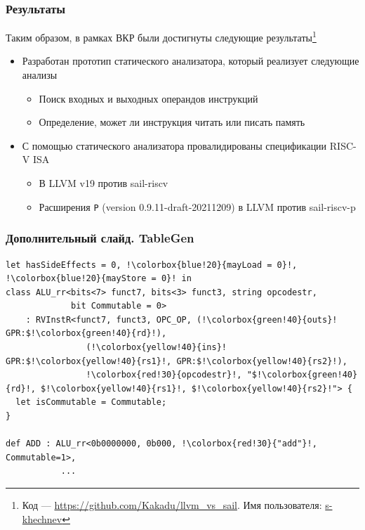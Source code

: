 \documentclass
  [ russian
  , aspectratio=169 %
  ] {beamer}
\begin{document}
\begin{frame}
    \frametitle{Результаты}

    Таким образом, в рамках ВКР были достигнуты следующие результаты\footnote[frame]{Код --- \url{https://github.com/Kakadu/llvm_vs_sail}. Имя пользователя: \href{https://github.com/s-khechnev}{s-khechnev}}
    \begin{itemize}
        \item Разработан прототип статического анализатора, который реализует следующие анализы
              \begin{itemize}
                  \item Поиск входных и выходных операндов инструкций
                  \item Определение, может ли инструкция читать или писать память
              \end{itemize}
        \item С помощью статического анализатора провалидированы спецификации RISC-V ISA
              \begin{itemize}
                  \item В LLVM v19 против sail-riscv
                  \item Расширения \texttt{P} (version 0.9.11-draft-20211209) в LLVM против sail-riscv-p
              \end{itemize}

    \end{itemize}


\end{frame}

\appendix

\begin{frame}[fragile]
    \frametitle{Дополнительный слайд. TableGen}

    \begin{lstlisting}[caption={Пример описания инструкции \texttt{add} на декларативном языке TableGen}, language=tblgen, frame=single, escapechar=!]
let hasSideEffects = 0, !\colorbox{blue!20}{mayLoad = 0}!, !\colorbox{blue!20}{mayStore = 0}! in
class ALU_rr<bits<7> funct7, bits<3> funct3, string opcodestr,
             bit Commutable = 0>
    : RVInstR<funct7, funct3, OPC_OP, (!\colorbox{green!40}{outs}! GPR:$!\colorbox{green!40}{rd}!),
                (!\colorbox{yellow!40}{ins}! GPR:$!\colorbox{yellow!40}{rs1}!, GPR:$!\colorbox{yellow!40}{rs2}!),
                !\colorbox{red!30}{opcodestr}!, "$!\colorbox{green!40}{rd}!, $!\colorbox{yellow!40}{rs1}!, $!\colorbox{yellow!40}{rs2}!"> {
  let isCommutable = Commutable;
}

def ADD : ALU_rr<0b0000000, 0b000, !\colorbox{red!30}{"add"}!, Commutable=1>,
           ...

    \end{lstlisting}

\end{frame}
\end{document}
